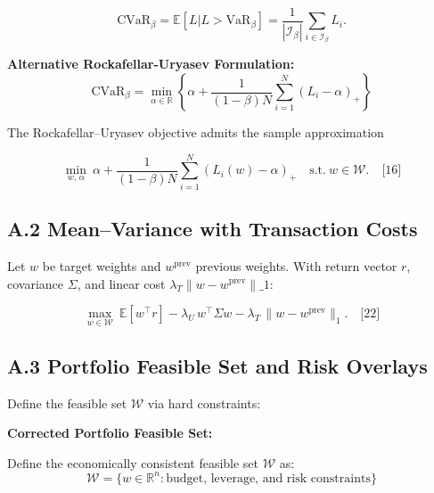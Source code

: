 \documentclass[11pt,a4paper]{article}
\begin{document}
\begin{equation}
\mathrm{CVaR}_\beta = \mathbb{E}[L | L > \mathrm{VaR}_\beta] = \frac{1}{|\mathcal{I}_\beta|}\sum_{i\in\mathcal{I}_\beta} L_i.
\end{equation}

\textbf{Alternative Rockafellar-Uryasev Formulation:}
\begin{equation}
\mathrm{CVaR}_\beta = \min_{\alpha \in \mathbb{R}} \left\{ \alpha + \frac{1}{(1-\beta)N}\sum_{i=1}^N (L_i-\alpha)_+ \right\}
\end{equation}

The Rockafellar–Uryasev objective admits the sample approximation

\begin{equation}
\min_{w,\,\alpha}\ \alpha + \frac{1}{(1-\beta)N}\sum_{i=1}^N (L_i(w)-\alpha)_+\quad\text{s.t.}\ w\in\mathcal{W}.\quad\text{[16]}
\end{equation}

\subsection{A.2 Mean–Variance with Transaction Costs}

Let $w$ be target weights and $w^{\text{prev}}$ previous weights. With return vector $r$, covariance $\Sigma$, and linear cost $\lambda_T\|w-w^{\text{prev}}\|\_1$:

\begin{equation}
\max_{w\in\mathcal{W}}\ \mathbb{E}[w^\top r] - \lambda_U\, w^\top\Sigma w - \lambda_T\,\|w-w^{\text{prev}}\|_1.\quad\text{[22]}
\end{equation}

\subsection{A.3 Portfolio Feasible Set and Risk Overlays}

Define the feasible set $\mathcal{W}$ via hard constraints:

\textbf{Corrected Portfolio Feasible Set:}

Define the economically consistent feasible set $\mathcal{W}$ as:
\begin{equation}
\mathcal{W} = \{w \in \mathbb{R}^n : \text{budget, leverage, and risk constraints}\}
\end{equation}
\end{document}
